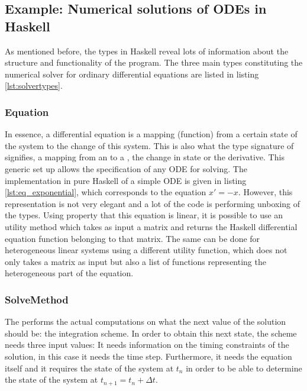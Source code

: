 \subsection{Example: Numerical solutions of ODEs in Haskell}
\label{s:numsolHaskell}
As mentioned before, the types in Haskell reveal lots of information about the structure and functionality of the program. The three main types constituting the numerical solver for ordinary differential equations are listed in listing \ref{lst:solvertypes}.



\subsubsection{Equation}
In essence, a differential equation is a mapping (function) from a certain state of the system to the change of this system. This is also what the type signature of  signifies, a mapping from an  to a , the change in state or the derivative. This generic set up allows the specification of any ODE for solving. The implementation in pure Haskell of a simple ODE is given in listing \ref{lst:eq_exponential}, which corresponds to the equation $x' = -x$. However, this representation is not very elegant and a lot of the code is performing unboxing of the types. Using property that this equation is linear, it is possible to use an utility method which takes as input a matrix and returns the Haskell differential equation function belonging to that matrix. The same can be done for heterogeneous linear systems using a different utility function, which does not only takes a matrix as input but also a list of functions representing the heterogeneous part of the equation.



\subsubsection{SolveMethod}
The  performs the actual computations on what the next value of the solution should be: the integration scheme. In order to obtain this next state, the scheme needs three input values: It needs information on the timing constraints of the solution, in this case it needs the time step. Furthermore, it needs the equation itself and it requires the state of the system at $t_{n}$ in order to be able to determine the state of the system at $t_{n+1} = t_{n} + \Delta t$.

